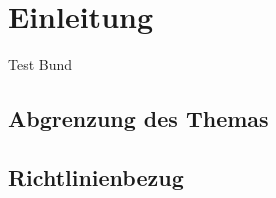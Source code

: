 \acresetall 

\chapter{Einleitung}

Test\autocite[vgl.][S.\,5]{forster_unterweisung_2003} 
Bund\autocite[vgl.][S.\,5]{bundesminister_fur_wirtschaft_und_energie_verordnung_2020}

\section{Abgrenzung des Themas}

\section{Richtlinienbezug}

